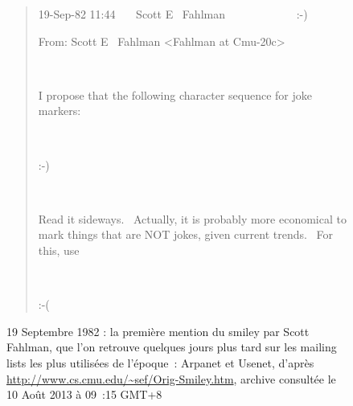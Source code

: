 \begin{figure}[htpb]
    \centering
    

    \begin{quote}
    19-Sep-82 11:44~~~ Scott E~ Fahlman~~~~~~~~~~~~ :-)

    From: Scott E~ Fahlman {\textless}Fahlman at Cmu-20c{\textgreater}

    ~
    
    I propose that the following character sequence for joke markers:

    ~~~~~~~ 

    :-)

    ~~~~~~~ 
    
    Read it sideways.~ Actually, it is probably more economical to mark things that are NOT jokes, given current trends.~ For this, use

    ~~~~~~~ 

    :-(

    \end{quote}
    \caption[la première mention du smiley par Scott Fahlman]{
        19 Septembre 1982 : la première mention du smiley par Scott Fahlman, que l’on retrouve quelques jours plus tard sur les mailing lists les plus utilisées de l’époque : Arpanet et Usenet, d’après \url{http://www.cs.cmu.edu/~sef/Orig-Smiley.htm}, archive consultée le 10 Août 2013 à 09 :15 GMT+8
    }
    \label{fig:smiley-story}
\end{figure}


